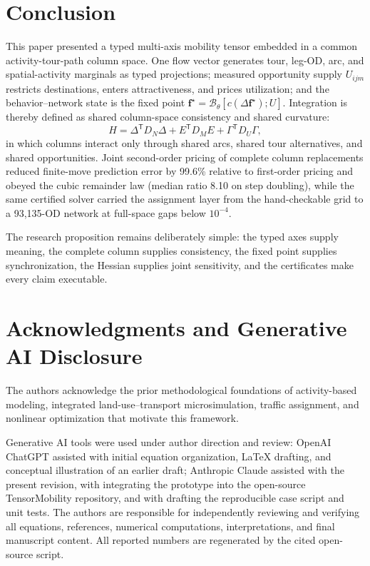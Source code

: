 \documentclass[10pt]{article}
\newcommand{\vect}[1]{\boldsymbol{#1}}
\newcommand{\T}{\mathsf{T}}
\newcommand{\Beh}{\mathcal{B}_{\theta}}
\begin{document}
\section{Conclusion}
This paper presented a typed multi-axis mobility tensor embedded in a common activity-tour-path column space. One flow vector generates tour, leg-OD, arc, and spatial-activity marginals as typed projections; measured opportunity supply $U_{ijm}$ restricts destinations, enters attractiveness, and prices utilization; and the behavior--network state is the fixed point $\vect f^{\star}=\Beh[c(\Delta\vect f^{\star});U]$. Integration is thereby defined as shared column-space consistency and shared curvature:
\[
H=\Delta^\T D_N\Delta+E^\T D_M E+\Gamma^\T D_U\Gamma,
\]
in which columns interact only through shared arcs, shared tour alternatives, and shared opportunities. Joint second-order pricing of complete column replacements reduced finite-move prediction error by 99.6\% relative to first-order pricing and obeyed the cubic remainder law (median ratio 8.10 on step doubling), while the same certified solver carried the assignment layer from the hand-checkable grid to a 93,135-OD network at full-space gaps below $10^{-4}$.

The research proposition remains deliberately simple: the typed axes supply meaning, the complete column supplies consistency, the fixed point supplies synchronization, the Hessian supplies joint sensitivity, and the certificates make every claim executable.

\section*{Acknowledgments and Generative AI Disclosure}
The authors acknowledge the prior methodological foundations of activity-based modeling, integrated land-use--transport microsimulation, traffic assignment, and nonlinear optimization that motivate this framework.

Generative AI tools were used under author direction and review: OpenAI ChatGPT assisted with initial equation organization, LaTeX drafting, and conceptual illustration of an earlier draft; Anthropic Claude assisted with the present revision, with integrating the prototype into the open-source TensorMobility repository, and with drafting the reproducible case script and unit tests. The authors are responsible for independently reviewing and verifying all equations, references, numerical computations, interpretations, and final manuscript content. All reported numbers are regenerated by the cited open-source script.

\printbibliography[title={References}]
\end{document}
